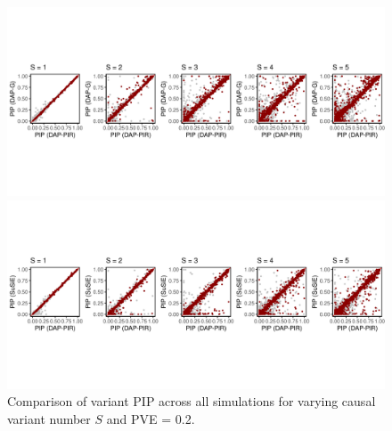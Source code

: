 \documentclass[pdflatex,sn-mathphys-num]{sn-jnl}%
\theoremstyle{thmstyleone}%
\theoremstyle{thmstyletwo}%
\theoremstyle{thmstylethree}%
\begin{document}
\begin{figure}[H]
    \centering
    \begin{minipage}{\textwidth}
        \centering
        \includegraphics[width=\textwidth,trim={0cm 2cm 0cm 2cm}, clip]{files/plot_pip_dap.png}
        \vspace{-1cm} %
    \end{minipage}
    \begin{minipage}{\textwidth}
        \centering
        \includegraphics[width=\textwidth, trim={0cm 2cm 0cm 2cm}, clip]{files/plot_pip_susie.png}
    \end{minipage}
    \caption{Comparison of variant PIP across all simulations for varying causal variant number $S$ and PVE = 0.2.}
    \label{fig:power}
\end{figure}
\end{document}
